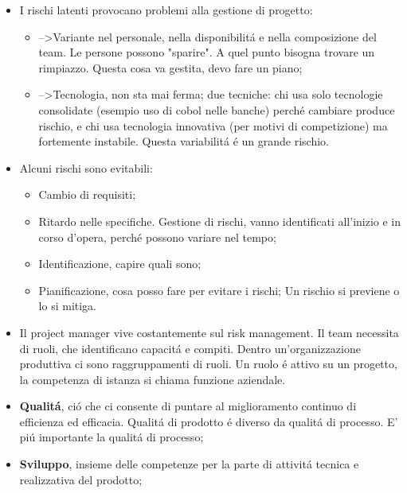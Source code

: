 \documentclass[10pt]{article}
\begin{document}
\begin{itemize}
\begin{itemize}
	\item I rischi latenti provocano problemi alla gestione di progetto:
	\begin{itemize}
		\item -->Variante nel personale, nella disponibilit\'a e nella 
		composizione del team. 
		Le persone possono	"sparire". A quel punto bisogna trovare un 
		rimpiazzo. Questa cosa va gestita, 
		devo fare un piano;
		
		\item -->Tecnologia, non sta mai ferma; due tecniche: chi usa solo 
		tecnologie consolidate (esempio uso di cobol nelle banche) perch\'e 
		cambiare produce rischio, e chi usa tecnologia 
		innovativa (per motivi di competizione) ma fortemente instabile. Questa 
		variabilit\'a \'e un grande rischio.
	\end{itemize}
		\item Alcuni rischi sono evitabili:
		\begin{itemize}
		\item Cambio di requisiti;
		
		\item Ritardo nelle specifiche.
		Gestione di rischi, vanno identificati all'inizio e in corso d'opera, 
		perch\'e possono variare nel tempo; 
		
		\item Identificazione, capire quali sono;
		
		\item Pianificazione, cosa posso fare per evitare i rischi;
		Un rischio si previene o lo si mitiga.	
		\end{itemize}
		


\item Il project manager vive costantemente sul risk management.
Il team necessita di ruoli, che identificano capacit\'a e compiti. Dentro 
un'organizzazione produttiva ci sono raggruppamenti di ruoli. Un ruolo \'e 
attivo su un progetto, la competenza di istanza si chiama funzione aziendale.

\item \textbf{Qualit\'a}, ci\'o che ci consente di puntare al miglioramento 
continuo di efficienza ed efficacia. Qualit\'a di prodotto \'e diverso da 
qualit\'a di processo. E' pi\'u importante la qualit\'a di 
processo;

\item \textbf{Sviluppo}, insieme delle competenze per la parte di attivit\'a 
tecnica e realizzativa del prodotto;


\end{itemize}
\end{itemize}
\end{document}
